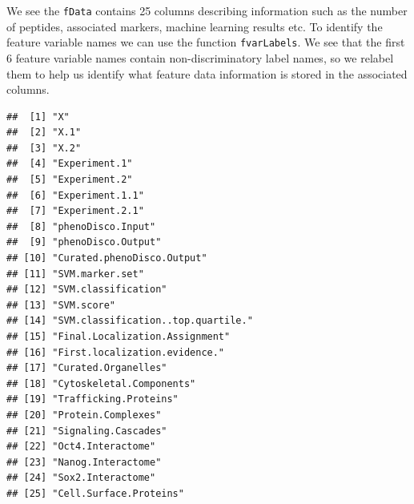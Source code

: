 We see the \texttt{fData} contains 25 columns describing information such as
the number of peptides, associated markers, machine learning results
etc. To identify the feature variable names we can use the function
\texttt{fvarLabels}. We see that the first 6 feature variable names contain
non-discriminatory label names, so we relabel them to help us identify
what feature data information is stored in the associated columns.

\begin{knitrout}
\color{fgcolor}\begin{kframe}
\begin{alltt}
\end{alltt}
\begin{verbatim}
##  [1] "X"                                
##  [2] "X.1"                              
##  [3] "X.2"                              
##  [4] "Experiment.1"                     
##  [5] "Experiment.2"                     
##  [6] "Experiment.1.1"                   
##  [7] "Experiment.2.1"                   
##  [8] "phenoDisco.Input"                 
##  [9] "phenoDisco.Output"                
## [10] "Curated.phenoDisco.Output"        
## [11] "SVM.marker.set"                   
## [12] "SVM.classification"               
## [13] "SVM.score"                        
## [14] "SVM.classification..top.quartile."
## [15] "Final.Localization.Assignment"    
## [16] "First.localization.evidence."     
## [17] "Curated.Organelles"               
## [18] "Cytoskeletal.Components"          
## [19] "Trafficking.Proteins"             
## [20] "Protein.Complexes"                
## [21] "Signaling.Cascades"               
## [22] "Oct4.Interactome"                 
## [23] "Nanog.Interactome"                
## [24] "Sox2.Interactome"                 
## [25] "Cell.Surface.Proteins"
\end{verbatim}
\begin{alltt}
\hlstd{(hl)[}\hlopt{:}\hlstd{]} \hlkwb{<-} \hlstd{(}\hlstd{,} \hlstd{,} \hlstd{)}
\hlstd{(hl)[}\hlopt{:}\hlstd{]} \hlkwb{<-} \hlstd{(}\hlstd{,} \hlopt{:}\hlstd{)}
\hlstd{(hl)[}\hlopt{:}\hlstd{,} \hlstd{(}\hlopt{:}\hlstd{,} \hlopt{:}\hlstd{)]}

\end{alltt}
\end{kframe}
\end{knitrout}
